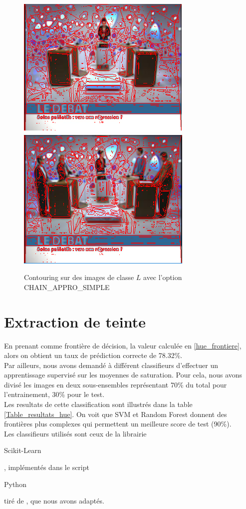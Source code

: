 \documentclass{book}
\begin{document}
\begin{figure}[H]
\begin{center}
\includegraphics[scale=0.5]{contouring_exemple1_classeL_passe2.png}
\includegraphics[scale=0.5]{contouring_exemple2_classeL_passe2.png}
\end{center}
\caption{Contouring sur des images de classe $L$ avec l'option CHAIN\_APPRO\_SIMPLE}
\label{contouringL2}
\end{figure}

\section{Extraction de teinte}
En prenant comme frontière de décision, la valeur calculée en \ref{hue_frontiere}, alors on obtient un taux de prédiction correcte de 78.32\%.\\
Par ailleurs, nous avons demandé à différent classifieurs d'effectuer un apprentissage supervisé sur les moyennes de saturation. Pour cela, nous avons divisé les images
en deux sous-ensembles représentant 70\% du total pour l'entrainement, 30\% pour le test.\\
Les resultats de cette classification sont illustrés dans la table \ref{Table_resultats_hue}. On voit que SVM et Random Forest donnent des frontières plus complexes qui permettent
un meilleure score de test (90\%).\\
Les classifieurs utilisés sont ceux de la librairie \begin{itshape}Scikit-Learn\end{itshape}, implémentés dans le script 
\begin{itshape}Python\end{itshape} tiré de \cite{scikit_bench}, que nous avons adaptés.
\end{document}
